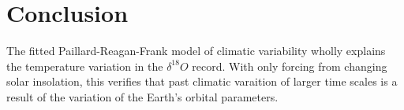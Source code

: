 \section{Conclusion}

The fitted Paillard-Reagan-Frank model of climatic variability wholly explains the temperature variation in the $\delta ^{18} O$ record.
With only forcing from changing solar insolation, this verifies that past climatic varaition of larger time scales is a result of the variation of the Earth's orbital parameters.


